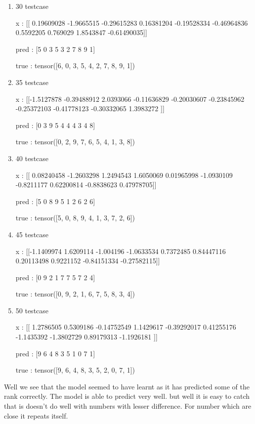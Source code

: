 \documentclass[journal,12pt,onecolumn]{IEEEtran}
\begin{document}
\begin{enumerate}
		pred :  [2 8 6 1 0 6 2 5 9 7]

		true :  tensor([3, 8, 6, 1, 0, 5, 2, 4, 9, 7])
	\item 30 testcase

		x :  [[ 0.19609028 -1.9665515  -0.29615283  0.16381204 -0.19528334 -0.46964836
   0.5592205   0.769029    1.8543847  -0.61490035]]

		pred :  [5 0 3 5 3 2 7 8 9 1]

		true :  tensor([6, 0, 3, 5, 4, 2, 7, 8, 9, 1])
	\item 35 testcase

		x :  [[-1.5127878  -0.39488912  2.0393066  -0.11636829 -0.20030607 -0.23845962
  -0.25372103 -0.41778123 -0.30332065  1.3983272 ]]

		pred :  [0 3 9 5 4 4 4 3 4 8]

		true :  tensor([0, 2, 9, 7, 6, 5, 4, 1, 3, 8])
	\item 40 testcase

		x :  [[ 0.08240458 -1.2603298   1.2494543   1.6050069   0.01965998 -1.0930109
  -0.8211177   0.62200814 -0.8838623   0.47978705]]

pred :  [5 0 8 9 5 1 2 6 2 6]

true :  tensor([5, 0, 8, 9, 4, 1, 3, 7, 2, 6])

\item 45 testcase

	x :  [[-1.1409974   1.6209114  -1.004196   -1.0633534   0.7372485   0.84447116
   0.20113498  0.9221152  -0.84151334 -0.27582115]]

pred :  [0 9 2 1 7 7 5 7 2 4]

true :  tensor([0, 9, 2, 1, 6, 7, 5, 8, 3, 4])

\item 50 testcase

	x :  [[ 1.2786505   0.5309186  -0.14752549  1.1429617  -0.39292017  0.41255176
  -1.1435392  -1.3802729   0.89179313 -1.1926181 ]]

pred :  [9 6 4 8 3 5 1 0 7 1]

true :  tensor([9, 6, 4, 8, 3, 5, 2, 0, 7, 1])

\end{enumerate}

Well we see that the model seemed to have learnt as it has predicted some of the rank correctly. The model is able to predict very well. but well it is easy to catch that is doesn't do well with numbers with lesser difference. For number which are close it repeats itself. 
\end{document}
